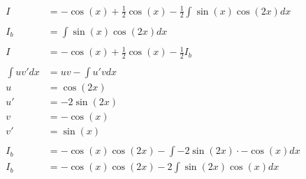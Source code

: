 \documentclass[12pt]{article}
\begin{document}
\begin{align}
    I              & = -\cos(x) + \frac{1}{2} \cos(x) - \frac{1}{2}  \int \sin(x)\cos(2x) dx                                                   \\
    \nonumber                                                                                                                                  \\
    I_b            & = \int \sin(x)\cos(2x) dx                                                                                                 \\
    \nonumber                                                                                                                                  \\
    I              & = -\cos(x) + \frac{1}{2} \cos(x) - \frac{1}{2}  I_b                                                                       \\
    \nonumber                                                                                                                                  \\
    \int uv' dx    & = uv - \int u'v dx                                                                                                        \\
    u              & = \cos(2x)                                                                                                                \\
    u'             & = -2\sin(2x)                                                                                                              \\
    v              & = -\cos(x)                                                                                                                \\
    v'             & = \sin(x)                                                                                                                 \\
    \nonumber                                                                                                                                  \\
    I_b            & = -\cos(x)\cos(2x) - \int -2\sin(2x) \cdot -\cos(x) dx                                                                    \\
    I_b            & = -\cos(x)\cos(2x) - 2\int \sin(2x)\cos(x) dx                                                                             \\

\end{align}
\end{document}
